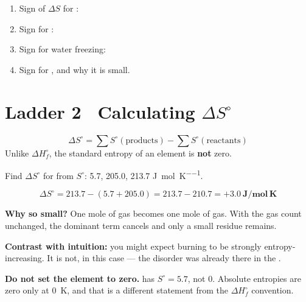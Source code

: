 \documentclass{apchem-worksheet}
\begin{document}
\begin{yourturn}
\begin{enumerate}[leftmargin=*,itemsep=0.5em]
  \item Sign of $\Delta S$ for :
        \workspace[1.4cm]
  \item Sign for : \workspace[1.4cm]
  \item Sign for water freezing: \workspace[1.4cm]
  \item Sign for , and why it is small.
        \workspace[1.8cm]
\end{enumerate}
\end{yourturn}

\section*{\sffamily Ladder 2 \textbullet\ Calculating $\Delta S^\circ$}

\[ \Delta S^\circ = \sum S^\circ(\text{products}) -
   \sum S^\circ(\text{reactants}) \]
Unlike $\Delta H_f^\circ$, the standard entropy of an element is
\textbf{not} zero.

\begin{workedexample}
Find $\Delta S^\circ$ for  from
$S^\circ$:  \num{5.7},  \num{205.0},
 \num{213.7} \si{\joule\per\mole\per\kelvin}.

\[ \Delta S^\circ = 213.7 - (5.7 + 205.0) = 213.7 - 210.7
   = \mathbf{+3.0~J/mol\,K} \]

\textbf{Why so small?} One mole of gas becomes one mole of gas. With the
gas count unchanged, the dominant term cancels and only a small residue
remains.

\textbf{Contrast with intuition:} you might expect burning to be strongly
entropy-increasing. It is not, in this case --- the disorder was already
there in the .

\textbf{Do not set the element to zero.}  has
$S^\circ = 5.7$, not 0. Absolute entropies are zero only at
\SI{0}{\kelvin}, and that is a different statement from the
$\Delta H_f^\circ$ convention.
\end{workedexample}
\end{document}
